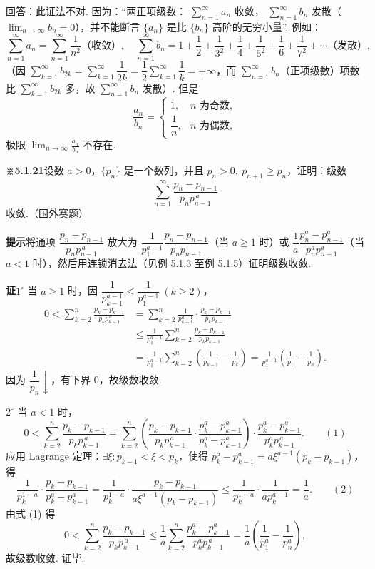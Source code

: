 \documentclass[UTF8,12pt,a4paper,fontset=fandol]{ctexart}
\begin{document}
回答：此证法不对. 因为：“两正项级数：
$\displaystyle\sum_{n=1}^{\infty}a_n$ 收敛，
$\displaystyle\sum_{n=1}^{\infty}b_n$ 发散（$\lim_{n\to\infty}b_n=0$），并不能断言
$\{a_n\}$ 是比 $\{b_n\}$ 高阶的无穷小量”. 例如：
\[
  \sum_{n=1}^{\infty}a_n=\sum_{n=1}^{\infty}\frac1{n^2}\text{（收敛）},\quad
  \sum_{n=1}^{\infty}b_n=1+\frac12+\frac1{3^2}+\frac14+\frac1{5^2}+\frac16+\frac1{7^2}+\cdots\text{（发散）},
\]
（因 $\displaystyle\sum_{k=1}^{\infty}b_{2k}
=\sum_{k=1}^{\infty}\dfrac1{2k}=\dfrac12\sum_{k=1}^{\infty}\dfrac1k=+\infty$，而
$\sum_{n=1}^{\infty}b_n$（正项级数）项数比 $\sum_{k=1}^{\infty}b_{2k}$ 多，故
$\sum_{n=1}^{\infty}b_n$ 发散）. 但是
\[
  \frac{a_n}{b_n}=
  \begin{cases}
  1, & n\text{ 为奇数},\\
  \dfrac1n, & n\text{ 为偶数},
  \end{cases}
\]
极限 $\displaystyle\lim_{n\to\infty}\frac{a_n}{b_n}$ 不存在.

\noindent\textbf{※5.1.21}\quad 设数 $a>0$，$\{p_n\}$ 是一个数列，并且
$p_n>0,\ p_{n+1}\ge p_n$，证明：级数
\[
  \sum_{n=1}^{\infty}\frac{p_n-p_{n-1}}{p_np_{n-1}^{\,a}}
\]
收敛.（国外赛题）

\noindent\textbf{提示}\quad 将通项 $\dfrac{p_n-p_{n-1}}{p_np_{n-1}^{\,a}}$ 放大为
$\dfrac1{p_1^{a-1}}\dfrac{p_n-p_{n-1}}{p_np_{n-1}}$（当 $a\ge1$ 时）或
$\dfrac1a\dfrac{p_n^a-p_{n-1}^a}{p_n^ap_{n-1}^a}$（当 $a<1$ 时），然后用连锁消去法（见例 5.1.3 至例 5.1.5）证明级数收敛.

\noindent\textbf{证}\quad $1^\circ$ 当 $a\ge1$ 时，因
$\dfrac1{p_{k-1}^{a-1}}\le\dfrac1{p_1^{a-1}}\ (k\ge2)$，
\[
\begin{aligned}
0<\sum_{k=2}^n\frac{p_k-p_{k-1}}{p_kp_{k-1}^{\,a}}
&=\sum_{k=2}^n\frac1{p_{k-1}^{a-1}}\cdot\frac{p_k-p_{k-1}}{p_kp_{k-1}}\\
&\le \frac1{p_1^{a-1}}\sum_{k=2}^n\frac{p_k-p_{k-1}}{p_kp_{k-1}}\\
&=\frac1{p_1^{a-1}}\sum_{k=2}^n\left(\frac1{p_{k-1}}-\frac1{p_k}\right)
=\frac1{p_1^{a-1}}\left(\frac1{p_1}-\frac1{p_n}\right).
\end{aligned}
\]
因为 $\dfrac1{p_n}\downarrow$，有下界 $0$，故级数收敛.

$2^\circ$ 当 $a<1$ 时，
\[
  0<\sum_{k=2}^n\frac{p_k-p_{k-1}}{p_kp_{k-1}^{\,a}}
  =\sum_{k=2}^n\left(\frac{p_k-p_{k-1}}{p_kp_{k-1}^{\,a}}\cdot
  \frac{p_k^a-p_{k-1}^a}{p_k^a-p_{k-1}^a}\right)
  \cdot\frac{p_k^a-p_{k-1}^a}{p_k^ap_{k-1}^{\,a}}.
\qquad(1)
\]
应用 Lagrange 定理：$\exists\xi:p_{k-1}<\xi<p_k$，使得
$p_k^a-p_{k-1}^a=a\xi^{a-1}(p_k-p_{k-1})$，得
\[
  \frac1{p_k^{1-a}}\cdot\frac{p_k-p_{k-1}}{p_k^a-p_{k-1}^a}
  =\frac1{p_k^{1-a}}\cdot
  \frac{p_k-p_{k-1}}{a\xi^{a-1}(p_k-p_{k-1})}
  \le\frac1{p_k^{1-a}}\cdot\frac1{ap_k^{a-1}}=\frac1a.
\qquad(2)
\]
由式 (1) 得
\[
  0<\sum_{k=2}^n\frac{p_k-p_{k-1}}{p_kp_{k-1}^{\,a}}
  \le\frac1a\sum_{k=2}^n\frac{p_k^a-p_{k-1}^a}{p_k^ap_{k-1}^{\,a}}
  =\frac1a\left(\frac1{p_1^a}-\frac1{p_n^a}\right),
\]
故级数收敛. 证毕.
\end{document}
